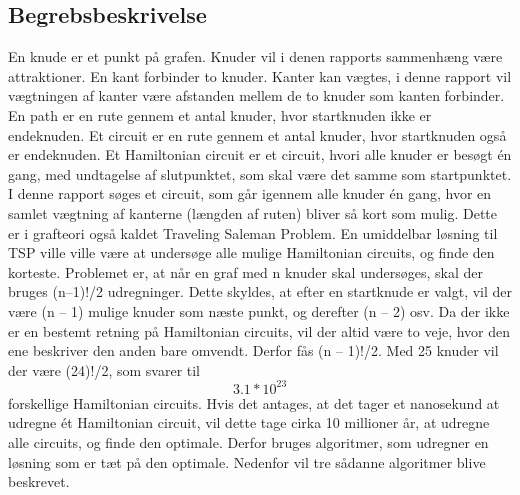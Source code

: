 \subsection{Begrebsbeskrivelse}
En knude er et punkt på grafen. Knuder vil i denen rapports sammenhæng være attraktioner. \newline
En kant forbinder to knuder. Kanter kan vægtes, i denne rapport vil vægtningen af kanter være afstanden mellem de to knuder som kanten forbinder. \newline
En path er en rute gennem et antal knuder, hvor startknuden ikke er endeknuden. \newline
Et circuit er en rute gennem et antal knuder, hvor startknuden også er endeknuden. \newline
Et  Hamiltonian circuit er et circuit, hvori alle knuder er besøgt én gang, med undtagelse af slutpunktet, som skal være det samme som startpunktet. \newline
I denne rapport søges et circuit, som går igennem alle knuder én gang, hvor en samlet vægtning af kanterne (længden af ruten) bliver så kort som mulig. Dette er i grafteori også kaldet Traveling Saleman Problem. En umiddelbar løsning til TSP ville ville være at undersøge alle mulige Hamiltonian circuits, og finde den korteste. Problemet er, at når en graf med n knuder skal undersøges, skal der bruges (n–1)!/2 udregninger. Dette skyldes, at efter en startknude er valgt, vil der være (n – 1) mulige knuder som næste punkt, og derefter (n – 2) osv. Da der ikke er en bestemt retning på Hamiltonian circuits, vil der altid være to veje, hvor den ene beskriver den anden  bare omvendt. Derfor fås (n – 1)!/2. 
Med 25 knuder vil der være (24)!/2, som svarer til \[3.1 * 10^{23}\] forskellige Hamiltonian circuits. Hvis det antages, at det tager et nanosekund at udregne ét Hamiltonian circuit, vil dette tage cirka 10 millioner år, at udregne alle circuits, og finde den optimale. Derfor bruges algoritmer, som udregner en løsning som er tæt på den optimale. Nedenfor vil tre sådanne algoritmer blive beskrevet. \citep{DisMat}

